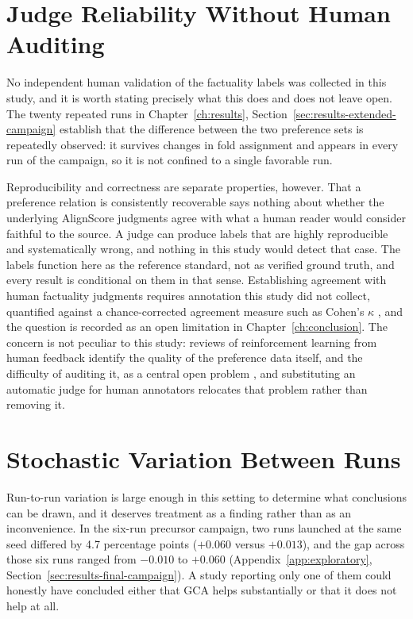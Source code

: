 \section{Judge Reliability Without Human Auditing}
\label{sec:disc-reliability}

No independent human validation of the factuality labels was collected in this
study, and it is worth stating precisely what this does and does not leave open.
The twenty repeated runs in Chapter~\ref{ch:results},
Section~\ref{sec:results-extended-campaign} establish that the difference between
the two preference sets is repeatedly observed: it survives changes in fold
assignment and appears in every run of the campaign, so it is not confined to a
single favorable run.

Reproducibility and correctness are separate properties, however. That a
preference relation is consistently recoverable says nothing about whether the
underlying AlignScore judgments agree with what a human reader would consider
faithful to the source. A judge can produce labels that are highly reproducible
and systematically wrong, and nothing in this study would detect that case. The
labels function here as the reference standard, not as verified ground truth, and
every result is conditional on them in that sense. Establishing agreement with
human factuality judgments requires annotation this study did not collect,
quantified against a chance-corrected agreement measure such as Cohen's $\kappa$
\citep{cohen1960coefficient}, and the question is recorded as an open limitation
in Chapter~\ref{ch:conclusion}. The concern is not peculiar to this study:
reviews of reinforcement learning from human feedback identify the quality of the
preference data itself, and the difficulty of auditing it, as a central open
problem \citep{casper2023open}, and substituting an automatic judge for human
annotators relocates that problem rather than removing it.

\section{Stochastic Variation Between Runs}
\label{sec:disc-stochasticity}

Run-to-run variation is large enough in this setting to determine what
conclusions can be drawn, and it deserves treatment as a finding rather than as
an inconvenience. In the six-run precursor campaign, two runs launched at the
same seed differed by 4.7 percentage points ($+0.060$ versus $+0.013$), and the
gap across those six runs ranged from $-0.010$ to $+0.060$
(Appendix~\ref{app:exploratory}, Section~\ref{sec:results-final-campaign}). A
study reporting only one of them could honestly have concluded either that GCA
helps substantially or that it does not help at all.


